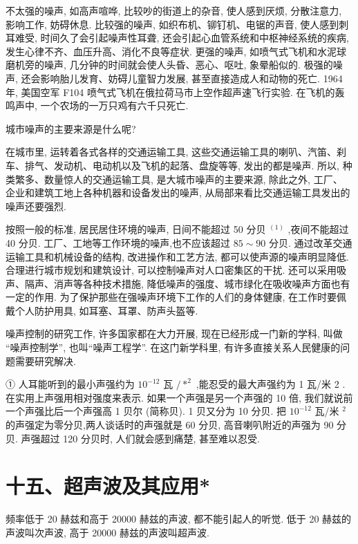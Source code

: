 \documentclass[10pt]{article}
\begin{document}
不太强的噪声, 如高声喧哗, 比较吵的街道上的杂音, 使人感到厌烦, 分散注意力, 影响工作, 妨碍休息. 比较强的噪声, 如织布机、铆钉机、电锯的声音, 使人感到刺耳难受, 时间久了会引起噪声性耳聋, 还会引起心血管系统和中枢神经系统的疾病, 发生心律不齐、血压升高、消化不良等症状. 更强的噪声, 如喷气式飞机和水泥球磨机旁的噪声, 几分钟的时间就会使人头昏、恶心、呕吐, 象晕船似的. 极强的噪声, 还会影响胎儿发育、妨碍儿童智力发展, 甚至直接造成人和动物的死亡. 1964 年, 美国空军 F104 喷气式飞机在俄拉荷马市上空作超声速飞行实验. 在飞机的轰鸣声中, 一个农场的一万只鸡有六千只死亡.

城市噪声的主要来源是什么呢?

在城市里, 运转着各式各样的交通运输工具, 这些交通运输工具的喇叭、汽笛、刹车、排气、发动机、电动机以及飞机的起落、盘旋等等, 发出的都是噪声. 所以, 种类繁多、数量惊人的交通运输工具, 是大城市噪声的主要来源, 除此之外, 工厂、 企业和建筑工地上各种机器和设备发出的噪声, 从局部来看比交通运输工具发出的噪声还要强烈.

按照一般的标准, 居民居住环境的噪声, 日间不能超过 50 分贝 \({}^{\left( 1\right) }\) ,夜间不能超过 40 分贝. 工厂、工地等工作环境的噪声,也不应该超过 \({85} \sim {90}\) 分贝. 通过改革交通运输工具和机械设备的结构, 改进操作和工艺方法, 都可以使声源的噪声明显降低. 合理进行城市规划和建筑设计, 可以控制噪声对人口密集区的干扰. 还可以采用吸声、隔声、消声等各种技术措施, 降低噪声的强度、城市绿化在吸收噪声方面也有一定的作用. 为了保护那些在强噪声环境下工作的人们的身体健康, 在工作时要佩戴个人防护用具, 如耳塞、耳罩、防声头盔等.

噪声控制的研究工作, 许多国家都在大力开展, 现在已经形成一门新的学科, 叫做 “噪声控制学”, 也叫“噪声工程学”. 在这门新学科里, 有许多直接关系人民健康的问题需要研究解决.

① 人耳能听到的最小声强约为 \({10}^{-{12}}\) 瓦 \(/{ * }^{2}\) ,能忍受的最大声强约为 1 瓦/米 2 . 在实用上声强用相对强度来表示. 如果一个声强是另一个声强的 10 倍, 我们就说前一个声强比后一个声强高 1 贝尔 (简称贝). 1 贝又分为 10 分贝. 把 \({10}^{-{12}}\) 瓦/米 \({}^{2}\) 的声强定为零分贝,两人谈话时的声强就是 60 分贝, 高音喇叭附近的声强为 90 分贝. 声强超过 120 分贝时, 人们就会感到痛楚, 甚至难以忍受.

\section*{十五、超声波及其应用*}

频率低于 20 赫兹和高于 20000 赫兹的声波, 都不能引起人的听觉. 低于 20 赫兹的声波叫次声波, 高于 20000 赫兹的声波叫超声波.
\end{document}

